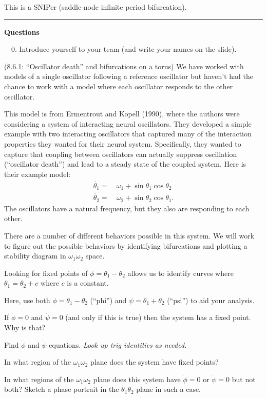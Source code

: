\documentclass[12pt,letterpaper,noanswers]{exam}
\begin{document}
This is a SNIPer (saddle-node infinite period bifurcation).

\vspace{0.2cm}

\hrule
\vspace{0.2cm}
\noindent\textbf{Questions}

\noindent \ \ 0.  Introduce yourself to your team (and write your names on the slide).

\begin{questions}

\question (8.6.1: ``Oscillator death'' and bifurcations on a torus)  We have worked with models of a single oscillator following a reference oscillator but haven't had the chance to work with a model where each oscillator responds to the other oscillator.

This model is from Ermentrout and Kopell (1990), where the authors were considering a system of interacting neural oscillators.  They developed a simple example with two interacting oscillators that captured many of the interaction properties they wanted for their neural system.  Specifically, they wanted to capture that coupling between oscillators can actually suppress oscillation (``oscillator death'') and lead to a steady state of the coupled system.  Here is their example model:
\begin{align*}
\dot{\theta_1} = &\ \omega_1 + \sin \theta_1 \cos\theta_2 \\
\dot{\theta_2} = &\ \omega_2 + \sin \theta_2 \cos\theta_1.
\end{align*}
The oscillators have a natural frequency, but they also are responding to each other.

There are a number of different behaviors possible in this system.
We will work to figure out the possible behaviors by identifying bifurcations and  plotting a stability diagram in $\omega_1\omega_2$ space.

\begin{parts}
\item Looking for fixed points of $\phi = \theta_1-\theta_2$ allows us to identify curves where $\theta_1 = \theta_2 + c$ where $c$ is a constant. 

Here, use both $\phi = \theta_1 - \theta_2$ (``phi'') and $\psi = \theta_1 + \theta_2$ (``psi'') to aid your analysis.  

If $\dot{\phi} = 0$ and $\dot{\psi} = 0$ (and only if this is true) then the system has a fixed point.  Why is that?
\item Find $\dot{\phi}$ and $\dot{\psi}$ equations.  \emph{Look up trig identities as needed.}
\item In what region of the $\omega_1\omega_2$ plane does the system have fixed points?
\item In what regions of the $\omega_1\omega_2$ plane does this system have $\dot{\phi} = 0$ or $\dot{\psi} = 0$ but not both?  Sketch a phase portrait in the $\theta_1\theta_2$ plane in such a case.
\end{parts} 


\end{questions}
\end{document}
